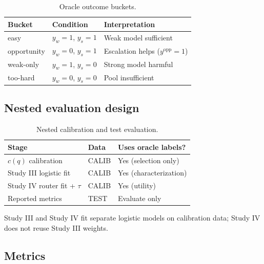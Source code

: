 \begin{table}[t]
  \centering
  \small
  \begin{tabular}{lll}
    \toprule
    \textbf{Bucket} & \textbf{Condition} & \textbf{Interpretation} \\
    \midrule
    easy & $y_w{=}1$, $y_s{=}1$ & Weak model sufficient \\
    opportunity & $y_w{=}0$, $y_s{=}1$ & Escalation helps ($y^{\text{opp}}{=}1$) \\
    weak-only & $y_w{=}1$, $y_s{=}0$ & Strong model harmful \\
    too-hard & $y_w{=}0$, $y_s{=}0$ & Pool insufficient \\
    \bottomrule
  \end{tabular}
  \caption{Oracle outcome buckets.}
  \label{tab:buckets-def}
\end{table}

\subsection{Nested evaluation design}
\label{sec:setup:nested}

\begin{table}[t]
  \centering
  \small
  \begin{tabular}{lll}
    \toprule
    \textbf{Stage} & \textbf{Data} & \textbf{Uses oracle labels?} \\
    \midrule
    $c(q)$ calibration & CALIB & Yes (selection only) \\
    Study III logistic fit & CALIB & Yes (characterization) \\
    Study IV router fit + $\tau$ & CALIB & Yes (utility) \\
    Reported metrics & TEST & Evaluate only \\
    \bottomrule
  \end{tabular}
  \caption{Nested calibration and test evaluation.}
  \label{tab:nested}
\end{table}

Study III and Study IV fit separate logistic models on calibration data; Study IV does not reuse Study III weights.

\subsection{Metrics}
\label{sec:setup:metrics}

